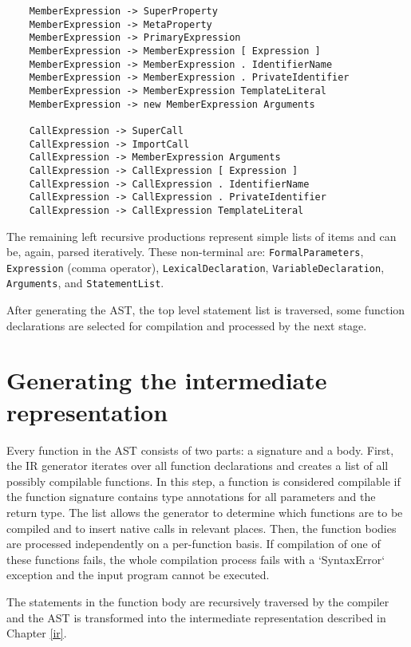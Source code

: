 \begin{verbatim}
    MemberExpression -> SuperProperty
    MemberExpression -> MetaProperty
    MemberExpression -> PrimaryExpression
    MemberExpression -> MemberExpression [ Expression ]
    MemberExpression -> MemberExpression . IdentifierName
    MemberExpression -> MemberExpression . PrivateIdentifier
    MemberExpression -> MemberExpression TemplateLiteral
    MemberExpression -> new MemberExpression Arguments

    CallExpression -> SuperCall
    CallExpression -> ImportCall
    CallExpression -> MemberExpression Arguments
    CallExpression -> CallExpression [ Expression ]
    CallExpression -> CallExpression . IdentifierName
    CallExpression -> CallExpression . PrivateIdentifier
    CallExpression -> CallExpression TemplateLiteral
\end{verbatim}

The remaining left recursive productions represent simple lists of items and can be, again, parsed iteratively. These non-terminal are: \texttt{FormalParameters}, \texttt{Expression} (comma operator), \texttt{LexicalDeclaration}, \texttt{VariableDeclaration}, \texttt{Arguments}, and \texttt{StatementList}.

After generating the AST, the top level statement list is traversed, some function declarations are selected for compilation and processed by the next stage.


\section{Generating the intermediate representation}

Every function in the AST consists of two parts: a signature and a body. First, the IR generator iterates over all function declarations and creates a list of all possibly compilable functions. In this step, a function is considered compilable if the function signature contains type annotations for all parameters and the return type. The list allows the generator to determine which functions are to be compiled and to insert native calls in relevant places. Then, the function bodies are processed independently on a per-function basis. If compilation of one of these functions fails, the whole compilation process fails with a `SyntaxError` exception and the input program cannot be executed.

The statements in the function body are recursively traversed by the compiler and the AST is transformed into the intermediate representation described in Chapter \ref{ir}.

